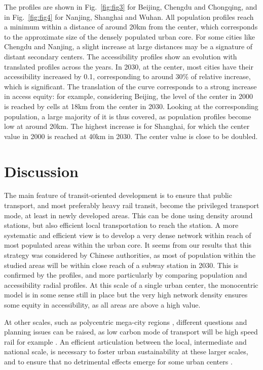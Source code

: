 \documentclass{article}
\begin{document}
The profiles are shown in Fig.~\ref{fig:fig3} for Beijing, Chengdu and Chongqing, and in Fig.~\ref{fig:fig4} for Nanjing, Shanghai and Wuhan. All population profiles reach a minimum within a distance of around 20km from the center, which corresponds to the approximate size of the densely populated urban core. For some cities like Chengdu and Nanjing, a slight increase at large distances may be a signature of distant secondary centers. The accessibility profiles show an evolution with translated profiles across the years. In 2030, at the center, most cities have their accessibility increased by 0.1, corresponding to around 30\% of relative increase, which is significant. The translation of the curve corresponds to a strong increase in access equity: for example, considering Beijing, the level of the center in 2000 is reached by cells at 18km from the center in 2030. Looking at the corresponding population, a large majority of it is thus covered, as population profiles become low at around 20km. The highest increase is for Shanghai, for which the center value in 2000 is reached at 40km in 2030. The center value is close to be doubled.



\section{Discussion}

The main feature of transit-oriented development is to ensure that public transport, and most preferably heavy rail transit, become the privileged transport mode, at least in newly developed areas. This can be done using density around stations, but also efficient local transportation to reach the station. A more systematic and efficient view is to develop a very dense network within reach of most populated areas within the urban core. It seems from our results that this strategy was considered by Chinese authorities, as most of population within the studied areas will be within close reach of a subway station in 2030. This is confirmed by the profiles, and more particularly by comparing population and accessibility radial profiles. At this scale of a single urban center, the monocentric model is in some sense still in place but the very high network density ensures some equity in accessibility, as all areas are above a high value.

At other scales, such as polycentric mega-city regions \cite{raimbault2021introducing}, different questions and planning issues can be raised, as low carbon mode of transport will be high speed rail for example \cite{wang2013spatial}. An efficient articulation between the local, intermediate and national scale, is necessary to foster urban sustainability at these larger scales, and to ensure that no detrimental effects emerge for some urban centers \cite{wang2018high}.
\end{document}
